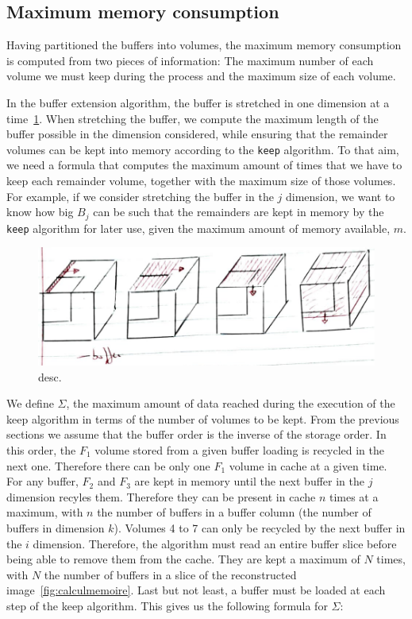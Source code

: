 \documentclass[conference]{IEEEtran}
\begin{document}
\subsection{Maximum memory consumption}

Having partitioned the buffers into volumes, the maximum memory consumption is
computed from two pieces of information: The maximum number of each volume we
must keep during the process and the maximum size of each volume.

In the buffer extension algorithm, the buffer is stretched in one dimension at
a time~\ref{fig:bufferextensionalgo}.
When stretching the buffer, we compute the maximum length of the buffer possible
in the dimension considered, while ensuring that the remainder volumes can be
kept into memory according to the \texttt{keep} algorithm. To that aim, we need
a formula that computes the maximum amount of times that we have to keep each
remainder volume, together with the maximum size of those volumes. For example, if
we consider stretching the buffer in the $j$ dimension, we want to know how big
$B_j$ can be such that the remainders are kept in memory by the \texttt{keep}
algorithm for later use, given the maximum amount of memory available, $m$.

\begin{figure}[h]
\centering
\includegraphics[scale=0.4]{./figures/new/bufferextensionalgo.png}
\caption{desc.}
\label{fig:bufferextensionalgo}
\end{figure}

We define $\Sigma$, the maximum amount of data reached during the execution
of the keep algorithm in terms of the number of volumes to be kept. From the
previous sections we assume that the buffer order is the inverse of the storage order.
In this order, the $F_1$ volume stored from a given buffer loading is recycled
in the next one. Therefore there can be only one $F_1$ volume in cache at a
given time. For any buffer, $F_2$ and $F_3$ are kept in memory until the next
buffer in the $j$ dimension recyles them. Therefore they can be present in cache
$n$ times at a maximum, with $n$ the number of buffers in a buffer column (the
number of buffers in dimension $k$). Volumes 4 to 7 can only be recycled by the
next buffer in the $i$ dimension. Therefore, the algorithm must read an entire
buffer slice before being able to remove them from the cache. They are kept a
maximum of $N$ times, with $N$ the number of buffers in a slice of the
reconstructed image~\ref{fig:calculmemoire}. Last but not least, a buffer must be loaded at each step of
the keep algorithm. This gives us the following formula for $\Sigma$:
\end{document}

